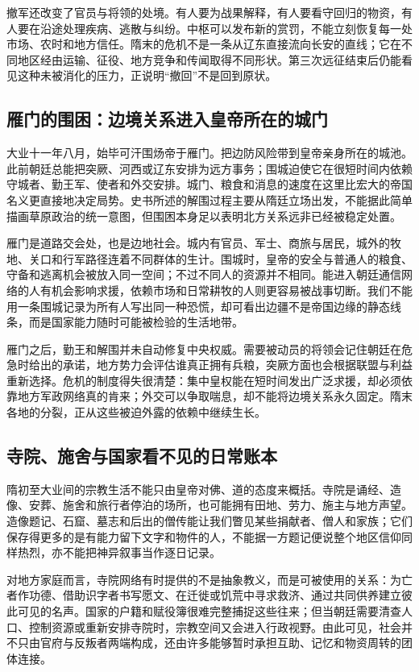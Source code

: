 撤军还改变了官员与将领的处境。有人要为战果解释，有人要看守回归的物资，有人要在沿途处理疾病、逃散与纠纷。中枢可以发布新的赏罚，不能立刻恢复每一处市场、农时和地方信任。隋末的危机不是一条从辽东直接流向长安的直线；它在不同地区经由运输、征役、地方竞争和传闻取得不同形状。第三次远征结束后仍能看见这种未被消化的压力，正说明“撤回”不是回到原状。

\subsection{雁门的围困：边境关系进入皇帝所在的城门}
大业十一年八月，始毕可汗围炀帝于雁门。把边防风险带到皇帝亲身所在的城池。此前朝廷总能把突厥、河西或辽东安排为远方事务；围城迫使它在很短时间内依赖守城者、勤王军、使者和外交安排。城门、粮食和消息的速度在这里比宏大的帝国名义更直接地决定局势。史书所述的解围过程主要从隋廷立场出发，不能据此简单描画草原政治的统一意图，但围困本身足以表明北方关系远非已经被稳定处置。

雁门是道路交会处，也是边地社会。城内有官员、军士、商旅与居民，城外的牧地、关口和行军路径连着不同群体的生计。围城时，皇帝的安全与普通人的粮食、守备和逃离机会被放入同一空间；不过不同人的资源并不相同。能进入朝廷通信网络的人有机会影响求援，依赖市场和日常耕牧的人则更容易被战事切断。我们不能用一条围城记录为所有人写出同一种恐慌，却可看出边疆不是帝国边缘的静态线条，而是国家能力随时可能被检验的生活地带。

雁门之后，勤王和解围并未自动修复中央权威。需要被动员的将领会记住朝廷在危急时给出的承诺，地方势力会评估谁真正拥有兵粮，突厥方面也会根据联盟与利益重新选择。危机的制度得失很清楚：集中皇权能在短时间发出广泛求援，却必须依靠地方军政网络真的肯来；外交可以争取喘息，却不能将边境关系永久固定。隋末各地的分裂，正从这些被迫外露的依赖中继续生长。

\subsection{寺院、施舍与国家看不见的日常账本}
隋初至大业间的宗教生活不能只由皇帝对佛、道的态度来概括。寺院是诵经、造像、安葬、施舍和旅行者停泊的场所，也可能拥有田地、劳力、施主与地方声望。造像题记、石窟、墓志和后出的僧传能让我们瞥见某些捐献者、僧人和家族；它们保存得更多的是有能力留下文字和物件的人，不能据一方题记便说整个地区信仰同样热烈，亦不能把神异叙事当作逐日记录。

对地方家庭而言，寺院网络有时提供的不是抽象教义，而是可被使用的关系：为亡者作功德、借助识字者书写愿文、在迁徙或饥荒中寻求救济、通过共同供养建立彼此可见的名声。国家的户籍和赋役簿很难完整捕捉这些往来；但当朝廷需要清查人口、控制资源或重新安排寺院时，宗教空间又会进入行政视野。由此可见，社会并不只由官府与反叛者两端构成，还由许多能够暂时承担互助、记忆和物资周转的团体连接。

